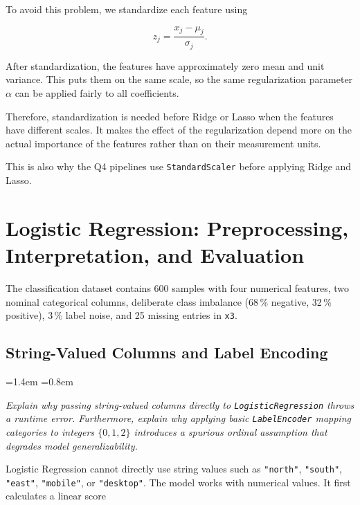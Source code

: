 \documentclass[12pt,a4paper]{article}
\newcommand{\qtext}[1]{%
  \begin{list}{}{\leftmargin=1.4em \rightmargin=0.8em
                 \topsep=3pt \parsep=0pt \itemsep=0pt}
  \item[]\itshape #1
  \end{list}}
\begin{document}
To avoid this problem, we standardize each feature using

\begin{equation}
z_j = \frac{x_j-\mu_j}{\sigma_j}.
\label{eq:zscore}
\end{equation}

After standardization, the features have approximately zero mean and unit variance. This puts them
on the same scale, so the same regularization parameter $\alpha$ can be applied fairly to all
coefficients.

Therefore, standardization is needed before Ridge or Lasso when the features have different
scales. It makes the effect of the regularization depend more on the actual importance of the
features rather than on their measurement units.

This is also why the Q4 pipelines use \texttt{StandardScaler} before applying Ridge and Lasso.

\section{Logistic Regression: Preprocessing, Interpretation, and Evaluation}

The classification dataset contains 600 samples with four numerical features, two nominal
categorical columns, deliberate class imbalance (68\,\% negative, 32\,\% positive), 3\,\% label
noise, and 25 missing entries in \texttt{x3}.



\subsection{String-Valued Columns and Label Encoding}

\qtext{Explain why passing string-valued columns directly to \texttt{LogisticRegression} throws a
runtime error. Furthermore, explain why applying basic \texttt{LabelEncoder} mapping categories to
integers $\{0,1,2\}$ introduces a spurious ordinal assumption that degrades model
generalizability.}

Logistic Regression cannot directly use string values such as \texttt{"north"}, \texttt{"south"},
\texttt{"east"}, \texttt{"mobile"}, or \texttt{"desktop"}. The model works with numerical values.
It first calculates a linear score
\end{document}
